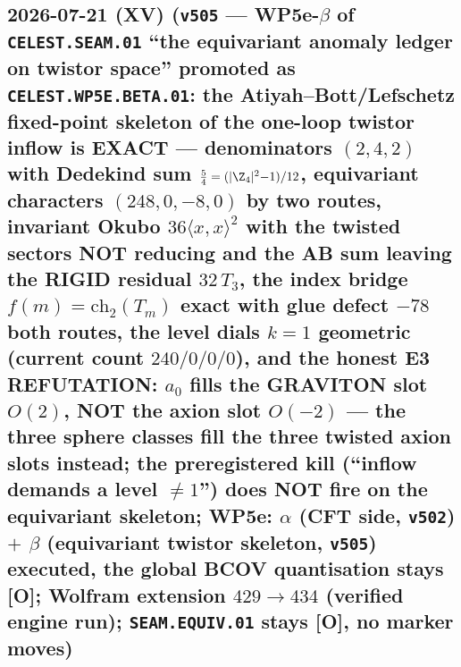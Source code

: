 \documentclass[11pt]{article}
\providecommand{\mO}{\textbf{[O]}}\providecommand{\mX}{\textbf{[X]}}
\begin{document}
\subsection*{2026-07-21 (XV) (\texttt{v505} --- WP5e-$\beta$ of \texttt{CELEST.SEAM.01} ``the equivariant anomaly ledger on twistor space'' promoted as \texttt{CELEST.WP5E.BETA.01}: the Atiyah--Bott/Lefschetz fixed-point skeleton of the one-loop twistor inflow is EXACT --- denominators $(2,4,2)$ with Dedekind sum $\tfrac54=(|\Z_4|^2{-}1)/12$, equivariant characters $(248,0,-8,0)$ by two routes, invariant Okubo $36\langle x,x\rangle^2$ with the twisted sectors NOT reducing and the AB sum leaving the RIGID residual $32\,T_3$, the index bridge $f(m)=\mathrm{ch}_2(T_m)$ exact with glue defect $-78$ both routes, the level dials $k=1$ geometric (current count $240/0/0/0$), and the honest E3 REFUTATION: $a_0$ fills the GRAVITON slot $O(2)$, NOT the axion slot $O(-2)$ --- the three sphere classes fill the three twisted axion slots instead; the preregistered kill (``inflow demands a level $\neq1$'') does NOT fire on the equivariant skeleton; WP5e: $\alpha$ (CFT side, \texttt{v502}) $+$ $\beta$ (equivariant twistor skeleton, \texttt{v505}) executed, the global BCOV quantisation stays \mO; Wolfram extension $429\to434$ (verified engine run); \texttt{SEAM.EQUIV.01} stays \mO, no marker moves)}
\end{document}
